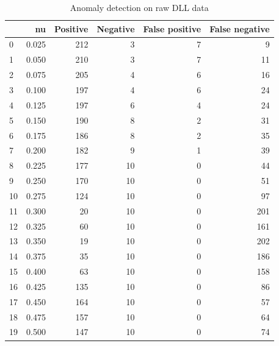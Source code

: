 \documentclass[a4paper,twoside,12pt]{book}
\begin{document}
\begin{appendices}
\begin{table}
	\centering
	\caption{Anomaly detection on raw DLL data}
	\label{id:tab:rawDlls}
	\begin{tabular}{lrrrrr}
		\toprule
		{} &     nu &  Positive &  Negative &  False positive &  False negative \\
		\midrule
		0  &  0.025 &       212 &         3 &               7 &               9 \\
		1  &  0.050 &       210 &         3 &               7 &              11 \\
		2  &  0.075 &       205 &         4 &               6 &              16 \\
		3  &  0.100 &       197 &         4 &               6 &              24 \\
		4  &  0.125 &       197 &         6 &               4 &              24 \\
		5  &  0.150 &       190 &         8 &               2 &              31 \\
		6  &  0.175 &       186 &         8 &               2 &              35 \\
		7  &  0.200 &       182 &         9 &               1 &              39 \\
		8  &  0.225 &       177 &        10 &               0 &              44 \\
		9  &  0.250 &       170 &        10 &               0 &              51 \\
		10 &  0.275 &       124 &        10 &               0 &              97 \\
		11 &  0.300 &        20 &        10 &               0 &             201 \\
		12 &  0.325 &        60 &        10 &               0 &             161 \\
		13 &  0.350 &        19 &        10 &               0 &             202 \\
		14 &  0.375 &        35 &        10 &               0 &             186 \\
		15 &  0.400 &        63 &        10 &               0 &             158 \\
		16 &  0.425 &       135 &        10 &               0 &              86 \\
		17 &  0.450 &       164 &        10 &               0 &              57 \\
		18 &  0.475 &       157 &        10 &               0 &              64 \\
		19 &  0.500 &       147 &        10 &               0 &              74 \\

\end{tabular}
\end{table}
\end{appendices}
\end{document}
